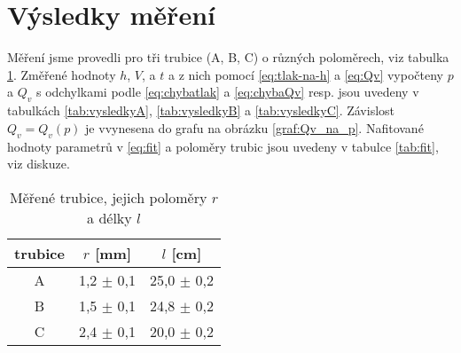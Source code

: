\section*{Výsledky měření}

Měření jsme provedli pro tři trubice (A, B, C) o různých poloměrech, viz tabulka \ref{tab:trubky}. Změřené hodnoty $h$, $V$, a $t$ a z nich pomocí \eqref{eq:tlak-na-h} a \eqref{eq:Qv} vypočteny $p$ a $Q_v$ s odchylkami podle \eqref{eq:chybatlak} a \eqref{eq:chybaQv} resp. jsou uvedeny v tabulkách \ref{tab:vysledkyA}, \ref{tab:vysledkyB} a \ref{tab:vysledkyC}. Závislost $Q_v=Q_v(p)$ je vvynesena do grafu na obrázku \ref{graf:Qv_na_p}. Nafitované hodnoty parametrů v \eqref{eq:fit} a poloměry trubic jsou uvedeny v tabulce \ref{tab:fit}, viz diskuze.


\begin{table}[htbp]
\centering
\begin{tabular}{|ccc|}
\hline trubice & $r$ [mm] & $l$ [cm] \\ \hline
 A & 1,2 $\pm$ 0,1 & 25,0 $\pm$ 0,2 \\ 
 B & 1,5 $\pm$ 0,1 & 24,8 $\pm$ 0,2 \\ 
 C & 2,4 $\pm$ 0,1 & 20,0 $\pm$ 0,2 \\ 
\hline 
\end{tabular} 
\caption{Měřené trubice, jejich poloměry $r$ a délky $l$}
\label{tab:trubky}
\end{table}

